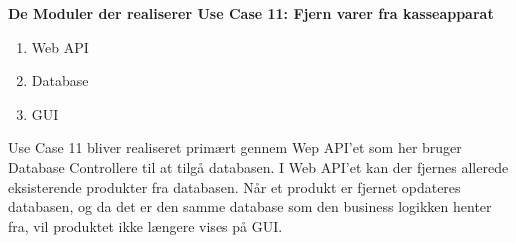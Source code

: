 \textbf{De Moduler der realiserer Use Case 11: Fjern varer fra kasseapparat}

\begin{enumerate}
	\item Web API
	\item Database
	\item GUI
\end{enumerate}
	
Use Case 11 bliver realiseret primært gennem Wep API'et som her bruger Database Controllere til at tilgå databasen. I Web API'et kan der fjernes allerede eksisterende produkter fra databasen. Når et produkt er fjernet opdateres databasen, og da det er den samme database som den business logikken henter fra, vil produktet ikke længere vises på GUI. 